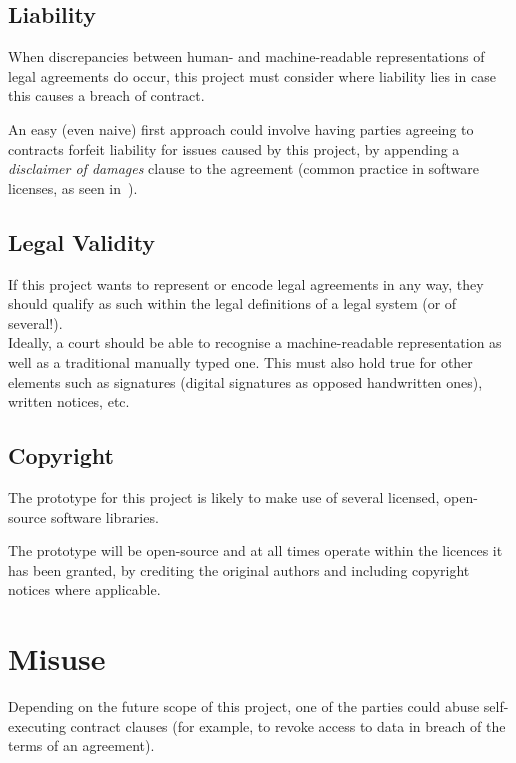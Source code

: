 
\subsection{Liability}\label{subsec:liability}

When discrepancies between human- and machine-readable representations of legal agreements do occur,
this project must consider where liability lies in case this causes a breach of contract.

An easy (even naive) first approach could involve having parties agreeing to contracts forfeit
liability for issues caused by this project, by appending a \textit{disclaimer of damages} clause to
the agreement (common practice in software licenses, as seen
in~\cite[]{jetbrainsToolbox}).


\subsection{Legal Validity}\label{subsec:legal-validity}

If this project wants to represent or encode legal agreements in any way, they should qualify as
such within the legal definitions of a legal system (or of several!).\\

Ideally, a court should be able to recognise a machine-readable representation as well as a
traditional manually typed one.
This must also hold true for other elements such as signatures (digital signatures as opposed
handwritten ones), written notices, etc.

\subsection{Copyright}\label{subsec:copyright}

The prototype for this project is likely to make use of several licensed, open-source software
libraries.

The prototype will be open-source and at all times operate within the licences it has been granted,
by crediting the original authors and including copyright notices where applicable.

\section{Misuse}\label{sec:misuse}

Depending on the future scope of this project, one of the parties could abuse self-executing
contract clauses (for example, to revoke access to data in breach of the terms of an agreement).


